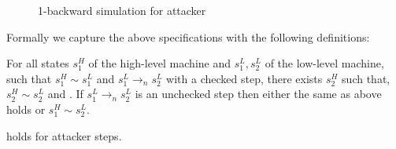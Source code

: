 \begin{minipage}{\linewidth}
\begin{minipage}{0.45\linewidth}
\begin{figure}[H]
\begin{center}
      \end{center}
      \caption{1-backward simulation for attacker}
    \end{figure}
    \bigskip
  \end{minipage}
\end{minipage}

Formally we capture the above specifications with the following definitions:

\begin{definition}
\label{backward_simulation_preservation}
  For all states $s^H_1$ of the high-level machine and $s^L_1, s^L_2$ of
  the low-level machine, such that $s^H_1 \sim s^L_1$ and $s^L_1 \to_n s^L_2$
  with a checked step, there exists $s^H_2$ such that,
  $s^H_2 \sim s^L_2$ and .
  If $s^L_1 \to_n s^L_2$ is an unchecked step then either the same as above
  holds or $s^H_1 \sim s^L_2$.
\end{definition}

\begin{definition}
\label{backward_simulation_a_preservation}
   holds for attacker steps.
\end{definition}




